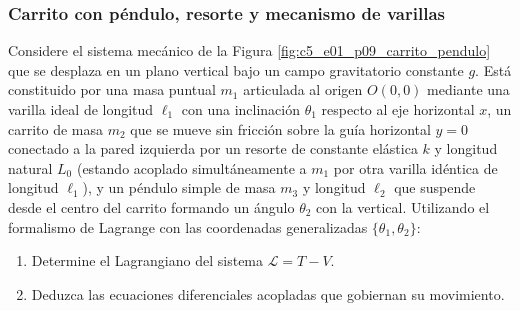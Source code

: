 \subsubsection{Carrito con péndulo, resorte y mecanismo de varillas}

Considere el sistema mecánico de la Figura \ref{fig:c5_e01_p09_carrito_pendulo} que se desplaza
en un plano vertical bajo un campo gravitatorio constante $g$. Está constituido por una masa
puntual $m_1$ articulada al origen $O(0,0)$ mediante una varilla ideal de longitud $\ell_1$ con
una inclinación $\theta_1$ respecto al eje horizontal $x$, un carrito de masa $m_2$ que se mueve
sin fricción sobre la guía horizontal $y=0$ conectado a la pared izquierda por un resorte de
constante elástica $k$ y longitud natural $L_0$ (estando acoplado simultáneamente a $m_1$ por
otra varilla idéntica de longitud $\ell_1$), y un péndulo simple de masa $m_3$ y longitud
$\ell_2$ que suspende desde el centro del carrito formando un ángulo $\theta_2$ con la vertical.
Utilizando el formalismo de Lagrange con las coordenadas generalizadas $\{\theta_1,\theta_2\}$:

\begin{enumerate}
    \item Determine el Lagrangiano del sistema $\mathcal{L} = T - V$.
    \item Deduzca las ecuaciones diferenciales acopladas que gobiernan su movimiento.
\end{enumerate}

